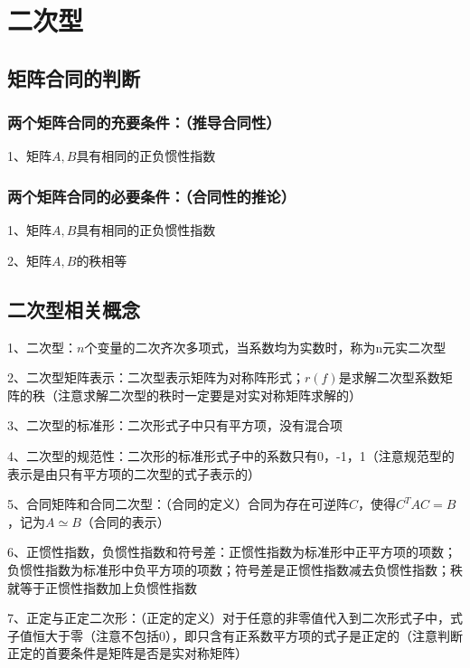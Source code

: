 \chapter{二次型}

\section{矩阵合同的判断}



\subsection{两个矩阵合同的充要条件：（推导合同性）}

1、矩阵$ A,B $具有相同的正负惯性指数



\subsection{两个矩阵合同的必要条件：（合同性的推论）}

1、矩阵$ A,B $具有相同的正负惯性指数

2、矩阵$ A,B $的秩相等

\section{二次型相关概念}

1、二次型：$ n $个变量的二次齐次多项式，当系数均为实数时，称为n元实二次型

2、二次型矩阵表示：二次型表示矩阵为对称阵形式；$ r(f) $是求解二次型系数矩阵的秩（注意求解二次型的秩时一定要是对实对称矩阵求解的）

3、二次型的标准形：二次形式子中只有平方项，没有混合项

4、二次型的规范性：二次形的标准形式子中的系数只有0，-1，1（注意规范型的表示是由只有平方项的二次型的式子表示的）

5、合同矩阵和合同二次型：（合同的定义）合同为存在可逆阵$ C $，使得$ C^TAC=B $，记为$ A \simeq B $（合同的表示）

6、正惯性指数，负惯性指数和符号差：正惯性指数为标准形中正平方项的项数；负惯性指数为标准形中负平方项的项数；符号差是正惯性指数减去负惯性指数；秩就等于正惯性指数加上负惯性指数

7、正定与正定二次形：（正定的定义）对于任意的非零值代入到二次形式子中，式子值恒大于零（注意不包括0），即只含有正系数平方项的式子是正定的（注意判断正定的首要条件是矩阵是否是实对称矩阵）

